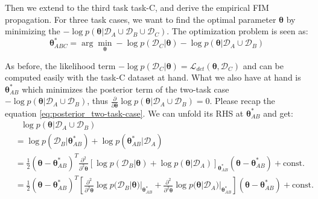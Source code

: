 \documentclass{article}
\begin{document}
Then we extend to the third task task-C, and derive the empirical FIM propagation.
For three task cases, we want to find the optimal parameter $\boldsymbol{\theta}$
by minimizing the $-\log p(\boldsymbol{\theta}|\mathcal D_A \cup \mathcal D_B \cup \mathcal D_C)$.
The optimization problem is seen as:
\begin{equation}
\boldsymbol{\theta}_{ABC}^*
= \arg \min_{\boldsymbol{\theta}}
- \log p(\mathcal D_C|\boldsymbol{\theta})
- \log p(\boldsymbol{\theta} | \mathcal D_A \cup \mathcal D_B)
\end{equation}

As before, the likelihood term
$- \log p(\mathcal D_C|\boldsymbol{\theta}) = \mathcal L_{det}(\boldsymbol{\theta}, \mathcal D_C)$
and can be computed easily with the task-C dataset at hand.
What we also have at hand is $\boldsymbol{\theta}_{AB}^*$ which minimizes
the posterior term of the two-task case $-\log p(\boldsymbol{\theta}|\mathcal D_A \cup \mathcal D_B)$,
thus $\frac{\partial}{\partial \boldsymbol{\theta}}\log p(\boldsymbol{\theta}|\mathcal D_A \cup \mathcal D_B) = 0$.
Please recap the equation \ref{eq:posterior_two-task-case}.
We can unfold its RHS at $\boldsymbol{\theta}_{AB}^*$ and get:
\begin{equation}
\begin{split}
&\text{\ \ \ \ }\log p(\boldsymbol{\theta}|\mathcal D_A \cup \mathcal D_B)\\
&= \log p(\mathcal D_B | \boldsymbol{\theta}_{AB}^*) + \log p(\boldsymbol{\theta}_{AB}^* | \mathcal D_A) \\
&= \frac{1}{2}(\boldsymbol{\theta} - \boldsymbol{\theta}_{AB}^*)^T
\frac{\partial^2}{\partial^2 \boldsymbol{\theta}}
[\log p(\mathcal D_B | \boldsymbol{\theta}) + \log p(\boldsymbol{\theta} | \mathcal D_A)]_{\boldsymbol{\theta}_{AB}^*}
(\boldsymbol{\theta} - \boldsymbol{\theta}_{AB}^*)+ \text{const.}\\
&=\frac{1}{2}(\boldsymbol{\theta} - \boldsymbol{\theta}_{AB}^*)^T
[\frac{\partial^2}{\partial^2 \boldsymbol{\theta}}
\log p(\mathcal D_B | \boldsymbol{\theta})|_{\boldsymbol{\theta}_{AB}^*} + \frac{\partial^2}{\partial^2 \boldsymbol{\theta}}\log p(\boldsymbol{\theta} | \mathcal D_A)|_{\boldsymbol{\theta}_{AB}^*}]
(\boldsymbol{\theta} - \boldsymbol{\theta}_{AB}^*)+ \text{const.}
\end{split}
\end{equation}
\end{document}
